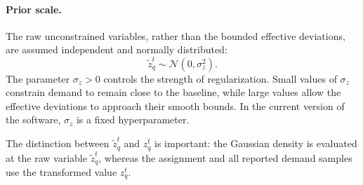 \paragraph{Prior scale.}
The raw unconstrained variables, rather than the bounded effective deviations, are
assumed independent and normally distributed:
\[
\widetilde{z}_q^t \sim \mathcal{N}(0,\sigma_z^2).
\]
The parameter $\sigma_z>0$ controls the strength of regularization.
Small values of $\sigma_z$ constrain demand to remain close to the baseline, while large values allow
the effective deviations to approach their smooth bounds.
In the current version of the software, $\sigma_z$ is a fixed
hyperparameter.

The distinction between $\widetilde{z}_q^t$ and $z_q^t$ is important: the
Gaussian density is evaluated at the raw variable $\widetilde{z}_q^t$, whereas
the assignment and all reported demand samples use the transformed value $z_q^t$.


